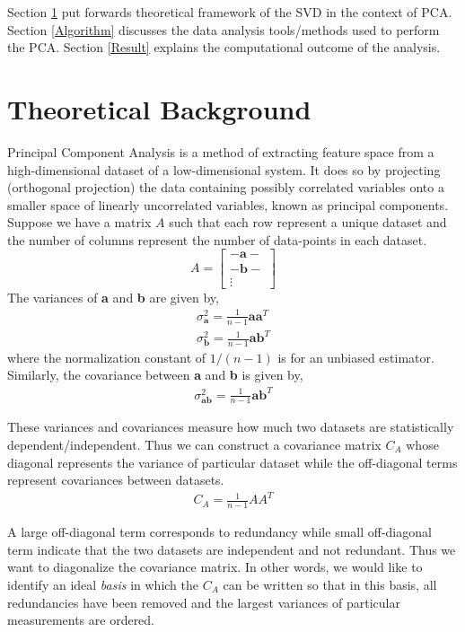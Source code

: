 \documentclass{article}
\begin{document}
Section \ref{Theory} put forwards theoretical framework of the SVD in the context of PCA. Section \ref{Algorithm} discusses the data analysis tools/methods used to perform the PCA. Section \ref{Result} explains the computational outcome of the analysis. 


\section{Theoretical Background}\label{Theory}
Principal Component Analysis is a method of extracting feature space from a high-dimensional dataset of a low-dimensional system. It does so by projecting (orthogonal projection) the data containing possibly correlated variables onto a smaller space of linearly uncorrelated variables, known as principal components. Suppose we have a matrix $A$ such that each row represent a unique dataset and the number of columns represent the number of data-points in each dataset.
\[
A=
\begin{bmatrix}
-\textbf{a}- \\
-\textbf{b}- \\
\vdots
\end{bmatrix}
\]
The variances of \textbf{a} and \textbf{b} are given by,
\begin{align*}
\sigma_{\textbf{a}}^2 = \frac{1}{n-1} \textbf{aa}^{T} \\
\sigma_{\textbf{b}}^2 = \frac{1}{n-1} \textbf{ab}^{T}
\end{align*}
where the normalization constant of $1/(n-1)$ is for an unbiased estimator. Similarly, the covariance between \textbf{a} and \textbf{b} is given by,
\begin{align*}
\sigma_{\textbf{ab}}^2 = \frac{1}{n-1} \textbf{ab}^{T} 
\end{align*}

These variances and covariances measure how much two datasets are statistically dependent/independent. Thus we can construct a covariance matrix $C_A$ whose diagonal represents the variance of particular dataset while the off-diagonal terms represent covariances between datasets. 
\begin{align*}
C_{{A}} = \frac{1}{n-1} {AA}^{T} 
\end{align*}

A large off-diagonal term corresponds to redundancy while small off-diagonal term indicate that the two datasets are independent and not redundant. Thus we want to diagonalize the covariance matrix. In other words, we would like to identify an ideal \emph{basis} in which the $C_{{A}}$ can be written so that in this basis, all redundancies have been removed and the largest variances of particular measurements are ordered.
\end{document}
